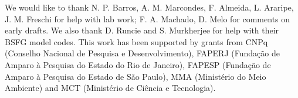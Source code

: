 \documentclass [twocolumn, natbib, nospthms, 10pt] {svjour3}
\begin{document}
\begin{acknowledgements}

  We would like to thank N. P. Barros, A. M. Marcondes, F. Almeida,
  L. Araripe, J. M. Freschi for help with lab work; F. A. Machado,
  D. Melo for comments on early drafts. We also thank D. Runcie and
  S. Murkherjee for help with their BSFG model codes. This work has
  been supported by grants from CNPq (Conselho Nacional de Pesquisa e
  Desenvolvimento), FAPERJ (Fundação de Amparo à Pesquisa do Estado do
  Rio de Janeiro), FAPESP (Fundação de Amparo à Pesquisa do Estado de
  São Paulo), MMA (Ministério do Meio Ambiente) and MCT (Ministério de
  Ciência e Tecnologia).

\end{acknowledgements}


% 
\end{document}
